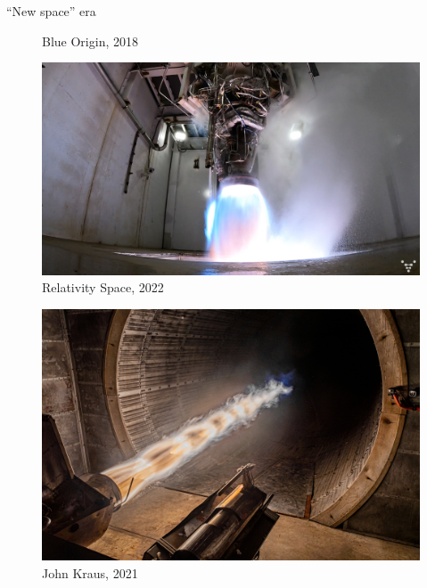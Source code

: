 \documentclass[]{beamer}
\begin{document}
\begin{frame}{``New space'' era}
\begin{minipage}{0.33\linewidth}
\begin{figure}
			\caption*{\tiny{Blue Origin, 2018}}
		\end{figure}
	\end{minipage}
	\begin{minipage}{0.33\linewidth}
		\begin{figure}
			\includegraphics[width=0.99\linewidth]{intro/aeonR.png}
			\caption*{\tiny{Relativity Space, 2022}}
		\end{figure}
	\end{minipage}
	\begin{minipage}{0.28\linewidth}
		\begin{figure}
			\includegraphics[width=0.99\linewidth]{intro/delphin.jpeg}
			\caption*{\tiny{John Kraus, 2021}}
		\end{figure}
	\end{minipage}
\end{frame}
\end{document}
